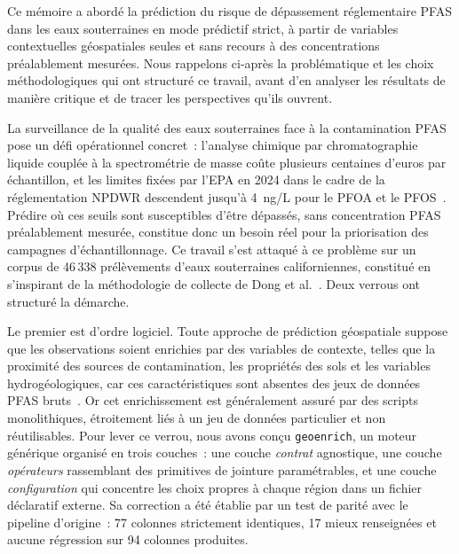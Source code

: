\label{chap:conclusion}

Ce m\'emoire a abord\'e la pr\'ediction du risque de d\'epassement r\'eglementaire PFAS dans les eaux souterraines en mode pr\'edictif strict, \`a partir de variables contextuelles g\'eospatiales seules et sans recours \`a des concentrations pr\'ealablement mesur\'ees. Nous rappelons ci-apr\`es la probl\'ematique et les choix m\'ethodologiques qui ont structur\'e ce travail, avant d'en analyser les r\'esultats de mani\`ere critique et de tracer les perspectives qu'ils ouvrent.

\label{sec:concl-problematique}

La surveillance de la qualit\'e des eaux souterraines face \`a la contamination PFAS pose un d\'efi op\'erationnel concret~: l'analyse chimique par chromatographie liquide coupl\'ee \`a la spectrom\'etrie de masse co\^ute plusieurs centaines d'euros par \'echantillon, et les limites fix\'ees par l'EPA en 2024 dans le cadre de la r\'eglementation NPDWR descendent jusqu'\`a 4~ng/L pour le PFOA et le PFOS~\cite{epa2023npdwr}. Pr\'edire o\`u ces seuils sont susceptibles d'\^etre d\'epass\'es, sans concentration PFAS pr\'ealablement mesur\'ee, constitue donc un besoin r\'eel pour la priorisation des campagnes d'\'echantillonnage. Ce travail s'est attaqu\'e \`a ce probl\`eme sur un corpus de 46\,338 pr\'el\`evements d'eaux souterraines californiennes, constitu\'e en s'inspirant de la m\'ethodologie de collecte de Dong et al.~\cite{dong2024pfas}. Deux verrous ont structur\'e la d\'emarche.

Le premier est d'ordre logiciel. Toute approche de pr\'ediction g\'eospatiale suppose que les observations soient enrichies par des variables de contexte, telles que la proximit\'e des sources de contamination, les propri\'et\'es des sols et les variables hydrog\'eologiques, car ces caract\'eristiques sont absentes des jeux de donn\'ees PFAS bruts~\cite{dong2024pfas,george2021pfas}. Or cet enrichissement est g\'en\'eralement assur\'e par des scripts monolithiques, \'etroitement li\'es \`a un jeu de donn\'ees particulier et non r\'eutilisables. Pour lever ce verrou, nous avons con\c{c}u \texttt{geoenrich}, un moteur g\'en\'erique organis\'e en trois couches~: une couche \emph{contrat} agnostique, une couche \emph{op\'erateurs} rassemblant des primitives de jointure param\'etrables, et une couche \emph{configuration} qui concentre les choix propres \`a chaque r\'egion dans un fichier d\'eclaratif externe. Sa correction a \'et\'e \'etablie par un test de parit\'e avec le pipeline d'origine~: 77 colonnes strictement identiques, 17 mieux renseign\'ees et aucune r\'egression sur 94 colonnes produites.


